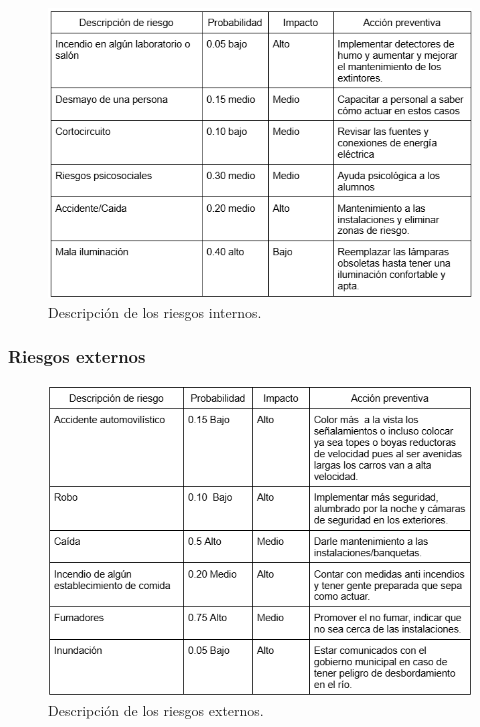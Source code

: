     \begin{figure}[H]
        \centering
        \includegraphics[scale=0.5]{35/Img/riesgosInternos.png}
        \caption{Descripción de los riesgos internos.}
    \end{figure}
    
    \subsubsection{Riesgos externos}
    
    \begin{figure}[H]
        \centering
        \includegraphics[scale=0.5]{35/Img/riesgosExternos.png}
        \caption{Descripción de los riesgos externos.}
    \end{figure}
    

